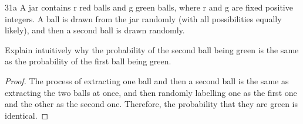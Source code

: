 \begin{exercise}{31a}
A jar contains r red balls and g green balls, where r and g are fixed positive integers.
A ball is drawn from the jar randomly (with all possibilities equally likely), and then a
second ball is drawn randomly.

Explain intuitively why the probability of the second ball being green is the same
as the probability of the first ball being green.
\end{exercise}

\begin{proof}
    The process of extracting one ball and then a second ball is the same as extracting the two balls at once, and then randomly labelling one as the first one and the other as the second one. Therefore, the probability that they are green is identical.
\end{proof}


